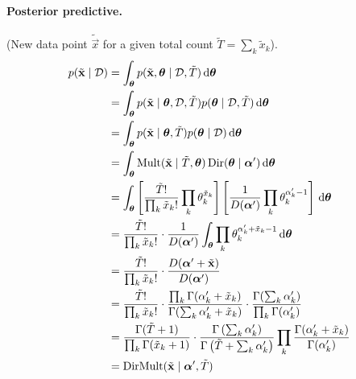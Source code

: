 \paragraph{Posterior predictive.} (New data point $\tilde{\vec x}$ for a given total count $\tilde T = \sum_k \tilde x_k$).
    \begin{align*}
        p(\tilde{\boldsymbol{\mathbf{x}}} \mid \mathcal D)   &= \int_{\boldsymbol{\mathbf{\theta}}} p(\tilde{\boldsymbol{\mathbf{x}}}, \boldsymbol{\mathbf{\theta}} \mid \mathcal D, \tilde T) \,\mathrm d\boldsymbol{\mathbf{\theta}} \\
                                            &= \int_{\boldsymbol{\mathbf{\theta}}} p(\tilde{\boldsymbol{\mathbf{x}}} \mid \boldsymbol{\mathbf{\theta}}, \mathcal D, \tilde T) p(\boldsymbol{\mathbf{\theta}} \mid \mathcal D, \tilde T) \,\mathrm d\boldsymbol{\mathbf{\theta}} \\
                                            &= \int_{\boldsymbol{\mathbf{\theta}}} p(\tilde{\boldsymbol{\mathbf{x}}} \mid \boldsymbol{\mathbf{\theta}}, \tilde T) p(\boldsymbol{\mathbf{\theta}} \mid \mathcal D) \,\mathrm d\boldsymbol{\mathbf{\theta}} \\
                                            &= \int_{\boldsymbol{\mathbf{\theta}}} \operatorname{Mult}(\tilde{\boldsymbol{\mathbf{x}}} \mid \tilde T, \boldsymbol{\mathbf{\theta}}) \operatorname{Dir}(\boldsymbol{\mathbf{\theta}} \mid \boldsymbol{\mathbf{\alpha}}') \,\mathrm d\boldsymbol{\mathbf{\theta}} \\
                                            &= \int_{\boldsymbol{\mathbf{\theta}}} \left[\frac{\tilde T!}{\prod_k \tilde x_k!} \prod_k \theta_k^{\tilde x_k}\right] \left[\frac{1}{D(\boldsymbol{\mathbf{\alpha}}')} \prod_k \theta_k^{\alpha'_k - 1}\right] \,\mathrm d\boldsymbol{\mathbf{\theta}} \\
                                            &= \frac{\tilde T!}{\prod_k \tilde x_k!} \cdot \frac{1}{D(\boldsymbol{\mathbf{\alpha}}')} \int_{\boldsymbol{\mathbf{\theta}}} \prod_k \theta_k^{\alpha'_k + \tilde x_k - 1} \,\mathrm d\boldsymbol{\mathbf{\theta}} \\
                                            &= \frac{\tilde T!}{\prod_k \tilde x_k!} \cdot \frac{D(\boldsymbol{\mathbf{\alpha}}' + \tilde{\boldsymbol{\mathbf{x}}})}{D(\boldsymbol{\mathbf{\alpha}}')} \\
                                            &= \frac{\tilde T!}{\prod_k \tilde x_k!} \cdot \frac{\prod_k \Gamma(\alpha'_k + \tilde x_k)}{\Gamma(\sum_k \alpha'_k + \tilde x_k)} \cdot \frac{\Gamma(\sum_k \alpha'_k)}{\prod_k \Gamma(\alpha'_k)} \\
                                            &= \frac{\Gamma(\tilde T + 1)}{\prod_k \Gamma(\tilde x_k + 1)} \cdot \frac{\Gamma\left(\sum_k \alpha'_k\right)}{\Gamma\left(\tilde T + \sum_k \alpha'_k\right)} \prod_k \frac{\Gamma(\alpha'_k + \tilde x_k)}{\Gamma(\alpha'_k)} \\
                                            &= \operatorname{DirMult}(\tilde{\boldsymbol{\mathbf{x}}} \mid \boldsymbol{\mathbf{\alpha}}', \tilde T)
    \end{align*}
